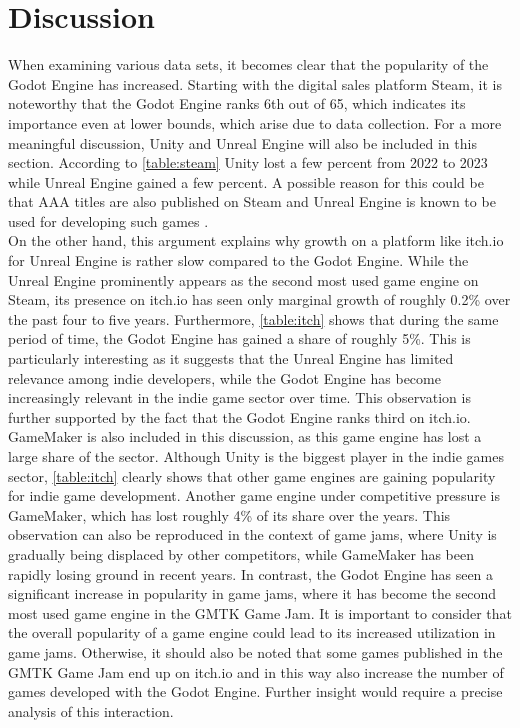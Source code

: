 \section{Discussion}
When examining various data sets, it becomes clear that the popularity of the Godot Engine has increased.
Starting with the digital sales platform Steam, it is noteworthy that the Godot Engine ranks 6th out of 65, which indicates its importance even at lower bounds, which arise due to data collection.
For a more meaningful discussion, Unity and Unreal Engine will also be included in this section.
According to \autoref{table:steam} Unity lost a few percent from 2022 to 2023 while Unreal Engine gained a few percent.
A possible reason for this could be that AAA titles are also published on Steam and Unreal Engine is known to be used for developing such games \cite{unreal-tripple-a-yager, unreal-tripple-a-india}.\\

On the other hand, this argument explains why growth on a platform like itch.io for Unreal Engine is rather slow compared to the Godot Engine.
While the Unreal Engine prominently appears as the second most used game engine on Steam, its presence on itch.io has seen only marginal growth of roughly 0.2\% over the past four to five years.
Furthermore, \autoref{table:itch} shows that during the same period of time, the Godot Engine has gained a share of roughly 5\%.
This is particularly interesting as it suggests that the Unreal Engine has limited relevance among indie developers, while the Godot Engine has become increasingly relevant in the indie game sector over time.
This observation is further supported by the fact that the Godot Engine ranks third on itch.io.\\

GameMaker is also included in this discussion, as this game engine has lost a large share of the sector.
Although Unity is the biggest player in the indie games sector, \autoref{table:itch} clearly shows that other game engines are gaining popularity for indie game development.
Another game engine under competitive pressure is GameMaker, which has lost roughly 4\% of its share over the years.
This observation can also be reproduced in the context of game jams, where Unity is gradually being displaced by other competitors, while GameMaker has been rapidly losing ground in recent years.
In contrast, the Godot Engine has seen a significant increase in popularity in game jams, where it has become the second most used game engine in the GMTK Game Jam.
It is important to consider that the overall popularity of a game engine could lead to its increased utilization in game jams.
Otherwise, it should also be noted that some games published in the GMTK Game Jam end up on itch.io and in this way also increase the number of games developed with the Godot Engine.
Further insight would require a precise analysis of this interaction. \\


